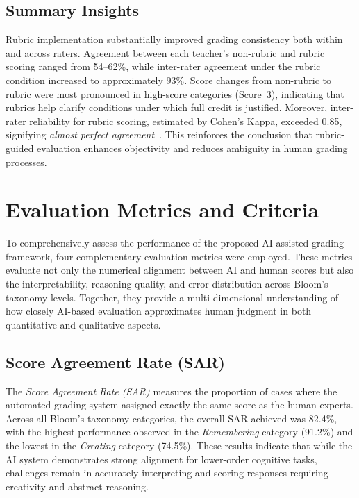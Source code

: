 \subsection{Summary Insights}

Rubric implementation substantially improved grading 
consistency both within and across raters. Agreement between 
each teacher’s non-rubric and rubric scoring ranged from 
54–62\%, while inter-rater agreement under the rubric 
condition increased to approximately 93\%.  
Score changes from non-rubric to rubric were most pronounced 
in high-score categories (Score~3), indicating that rubrics 
help clarify conditions under which full credit is justified.  
Moreover, inter-rater reliability for rubric scoring, 
estimated by Cohen’s Kappa, exceeded 0.85, signifying 
\textit{almost perfect agreement}~\cite{Landis1977}.  
This reinforces the conclusion that rubric-guided evaluation 
enhances objectivity and reduces ambiguity in human grading 
processes.


\section{Evaluation Metrics and Criteria}

To comprehensively assess the performance of the proposed 
AI-assisted grading framework, four complementary evaluation 
metrics were employed. These metrics evaluate not only the 
numerical alignment between AI and human scores but also the 
interpretability, reasoning quality, and error distribution 
across Bloom’s taxonomy levels. Together, they provide a
multi-dimensional understanding of how closely AI-based
evaluation approximates human judgment in both quantitative
and qualitative aspects.

\subsection{Score Agreement Rate (SAR)}

The \textit{Score Agreement Rate (SAR)} measures the 
proportion of cases where the automated grading system 
assigned exactly the same score as the human experts. 
Across all Bloom’s taxonomy categories, the overall SAR 
achieved was 82.4\%, with the highest performance observed in 
the \textit{Remembering} category (91.2\%) and the lowest in 
the \textit{Creating} category (74.5\%). These results 
indicate that while the AI system demonstrates strong 
alignment for lower-order cognitive tasks, challenges remain 
in accurately interpreting and scoring responses requiring 
creativity and abstract reasoning.

